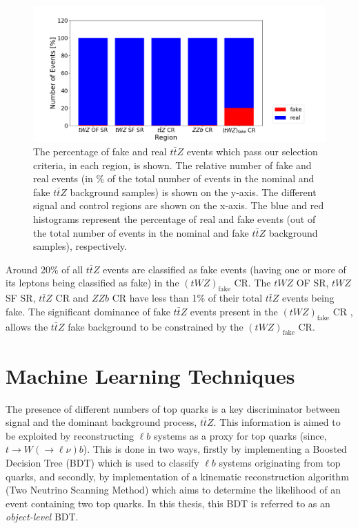 \begin{figure}[htbp]
\centering

    \includegraphics[width=.55\textwidth]{figures/iff_bar_3.png}   

    \caption{The percentage of fake and real $t\bar{t}Z$ events which pass our selection criteria, in each region, is shown. The relative number of fake and real events (in $\%$ of the total number of events in the nominal and fake $t\bar{t}Z$ background samples) is shown on the y-axis. The different signal and control regions are shown on the x-axis. The blue and red histograms represent the percentage of real and fake events (out of the total number of events in the nominal and fake $t\bar{t}Z$ background samples), respectively. }
  \label{fig:4lep-iff-bar3}
\end{figure}

Around 20$\%$ of all $t\bar{t}Z$ events are classified as fake events (having one or more of its leptons being classified as fake) in the $(tWZ)_{\text{fake}}$ CR. The $tWZ$ OF SR, $tWZ$ SF SR, $t\bar{t}Z$ CR and $ZZb$ CR have less than 1$\%$ of their total $t\bar{t}Z$ events being fake. The significant dominance of fake $t\bar{t}Z$ events present in the $(tWZ)_{\text{fake}}$ CR , allows the $t\bar{t}Z$ fake background to be constrained by the $(tWZ)_{\text{fake}}$ CR.


\section{Machine Learning Techniques}
The presence of different numbers of top quarks is a key discriminator between signal and the dominant background process, $t\bar{t}Z$. This information is aimed to be exploited by reconstructing $\ell b$ systems as a proxy for top quarks (since, $t\rightarrow W(\rightarrow \ell \nu) b$). This is done in two ways, firstly by implementing a Boosted Decision Tree (BDT) which is used to classify $\ell b$ systems originating from top quarks, and secondly, by implementation of a kinematic reconstruction algorithm (Two Neutrino Scanning Method) which aims to determine the likelihood of an event containing two top quarks. In this thesis, this BDT is referred to as an \textit{object-level} BDT.\\

